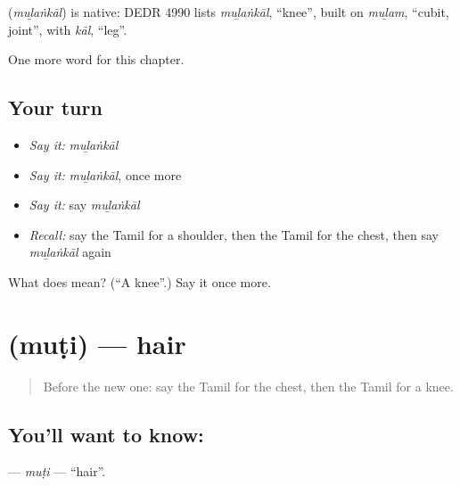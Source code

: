 \begin{cousinweb}
\textbf{} (\emph{muḻaṅkāl}) is native: DEDR 4990 lists \emph{muḻaṅkāl}, \textquotedblleft{}knee\textquotedblright{}, built on \emph{muḻam}, \textquotedblleft{}cubit, joint\textquotedblright{}, with \emph{kāl}, \textquotedblleft{}leg\textquotedblright{}.
\end{cousinweb}

\begin{grammarlens}[title={What you've built}]
One more word for this chapter.
\end{grammarlens}

\subsection*{Your turn}
\begin{itemize}
\raggedright
  \item \emph{Say it:} \emph{muḻaṅkāl}
  \item \emph{Say it:} \emph{muḻaṅkāl}, once more
  \item \emph{Say it:} say \emph{muḻaṅkāl}
  \item \emph{Recall:} say the Tamil for a shoulder, then the Tamil for the chest, then say \emph{muḻaṅkāl} again
\end{itemize}

\begin{tcolorbox}[breakable,colback=teal!4,colframe=teal!35!black,title={Before you move on}]
What does  mean? (\textquotedblleft{}A knee\textquotedblright{}.) Say it once more.
\end{tcolorbox}
\section[\texorpdfstring{\ta{முடி} (muṭi)}{முடி (muṭi)}]{ (muṭi) — hair}

\label{lesson:TA-C133-muti}



\begin{quote}
Before the new one: say the Tamil for the chest, then the Tamil for a knee.
\end{quote}

\subsection*{You'll want to know: }
\textbf{} — \emph{muṭi} — \textquotedblleft{}hair\textquotedblright{}.


